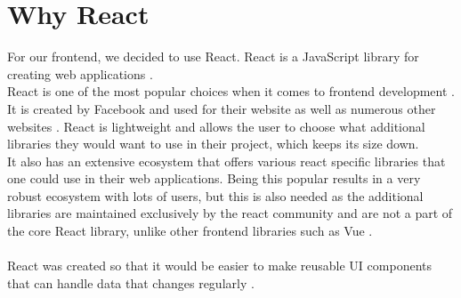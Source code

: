 \section{Why React}
For our frontend, we decided to use React.
React is a JavaScript library for creating web applications \cite{ReactJS}. 
\\
React is one of the most popular choices when it comes to frontend development \cite{NPMVueReactAngular}.
It is created by Facebook and used for their website as well as numerous other websites \cite{ReactHistory}.
React is lightweight and allows the user to choose what additional libraries they would want to use in their project, which keeps its size down.
\\
It also has an extensive ecosystem that offers various react specific libraries that one could use in their web applications.
Being this popular results in a very robust ecosystem with lots of users, but this is also needed as the additional libraries are maintained exclusively by the react community and are not a part of the core React library, unlike other frontend libraries such as Vue \cite{Vue}.
\\\\
React was created so that it would be easier to make reusable UI components that can handle data that changes regularly \cite{ReactHistory}.
